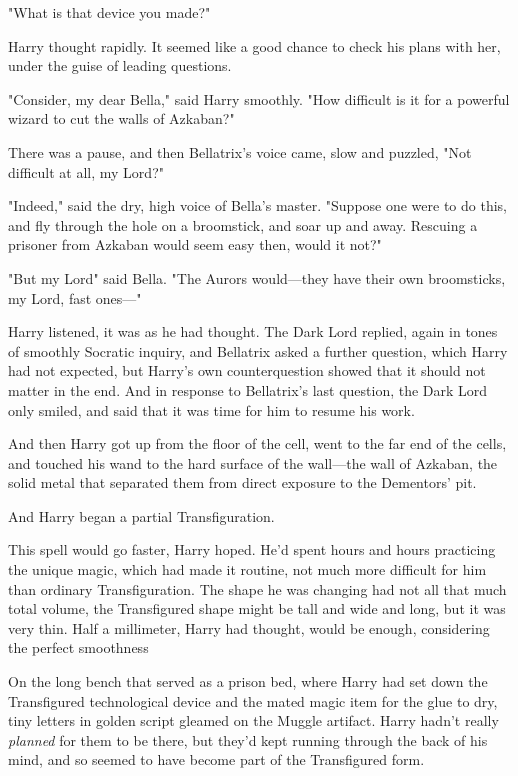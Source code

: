"What is that device you made?"

Harry thought rapidly. It seemed like a good chance to check his plans with
her, under the guise of leading questions.

"Consider, my dear Bella," said Harry smoothly. "How difficult is it for a
powerful wizard to cut the walls of Azkaban?"

There was a pause, and then Bellatrix's voice came, slow and puzzled, "Not
difficult at all, my Lord\el?"

"Indeed," said the dry, high voice of Bella's master. "Suppose one were to do
this, and fly through the hole on a broomstick, and soar up and away. Rescuing
a prisoner from Azkaban would seem easy then, would it not?"

"But my Lord{\el}" said Bella. "The Aurors would---they have their own
broomsticks, my Lord, fast ones\mbox{---}"

Harry listened, it was as he had thought. The Dark Lord replied, again in tones
of smoothly Socratic inquiry, and Bellatrix asked a further question, which
Harry had not expected, but Harry's own counterquestion showed that it should
not matter in the end. And in response to Bellatrix's last question, the Dark
Lord only smiled, and said that it was time for him to resume his work.

And then Harry got up from the floor of the cell, went to the far end of the
cells, and touched his wand to the hard surface of the wall---the wall of
Azkaban, the solid metal that separated them from direct exposure to the
Dementors' pit.

And Harry began a partial Transfiguration.

This spell would go faster, Harry hoped. He'd spent hours and hours practicing
the unique magic, which had made it routine, not much more difficult for him
than ordinary Transfiguration. The shape he was changing had not all that much
total volume, the Transfigured shape might be tall and wide and long, but it
was very thin. Half a millimeter, Harry had thought, would be enough,
considering the perfect smoothness{\el}

On the long bench that served as a prison bed, where Harry had set down the
Transfigured technological device and the mated magic item for the glue to dry,
tiny letters in golden script gleamed on the Muggle artifact. Harry hadn't
really \emph{planned} for them to be there, but they'd kept running through the
back of his mind, and so seemed to have become part of the Transfigured form.

